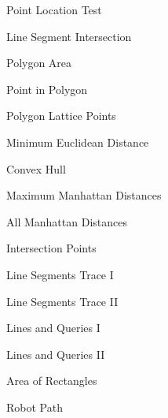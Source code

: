 \begin{practice}
\begin{pplist}
  \item Point Location Test
  \item Line Segment Intersection
  \item Polygon Area
  \item Point in Polygon
  \item Polygon Lattice Points
  \item Minimum Euclidean Distance
  \item Convex Hull
  \item Maximum Manhattan Distances
  \item All Manhattan Distances
  \item Intersection Points
  \item Line Segments Trace I
  \item Line Segments Trace II
  \item Lines and Queries I
  \item Lines and Queries II
  \item Area of Rectangles
  \item Robot Path
\end{pplist}
\end{practice}
